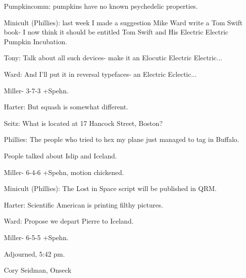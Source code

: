 \documentclass[12pt]{article}
\begin{document}
Pumpkincomm: pumpkins have no known psychedelic properties.

Minicult (Phillies): last week I made a suggestion Mike Ward write a Tom Swift book- I now think it should be entitled Tom Swift and His Electric Electric Pumpkin Incubation.

Tony: Talk about all such devices- make it an Elocutic Electric Electric...

Ward: And I'll put it in reversal typefaces- an Electric Eclectic...

Miller- 3-7-3 +Spehn.

Harter: But squash is somewhat different.

Seitz: What is located at 17 Hancock Street, Boston?

Phillies: The people who tried to hex my plane just managed to tag in Buffalo.

People talked about Islip and Iceland.

Miller- 6-4-6 +Spehn, motion chickened.

Minicult (Phillies): The Lost in Space script will be published in QRM.

Harter: Scientific American is printing filthy pictures.

Ward: Propose we depart Pierre to Iceland.

Miller- 6-5-5 +Spehn.

Adjourned, 5:42 pm.

\vspace{12pt}

\centerline{Cory Seidman, Onseck}
\end{document}
